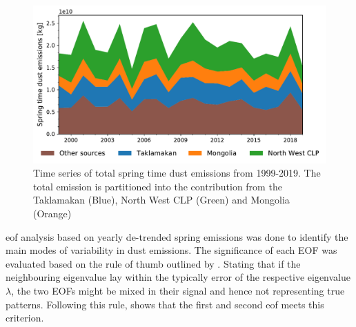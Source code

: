 \begin{figure}[htbp]
    \centering
    \includegraphics[width=\textwidth]{../figs/Emission_timeseries.pdf}
    \caption{Time series of total spring time dust emissions from 1999-2019. The total emission is partitioned into the contribution from the Taklamakan (Blue), North West CLP (Green) and Mongolia (Orange) }
    \label{fig:emission_timeseries}
\end{figure}
\acrfull{eof} analysis based on yearly de-trended spring emissions was done to identify the main modes of variability in dust emissions. The significance of each EOF was evaluated based on the rule of thumb outlined by \textcite{north1982sampling}. Stating that if the neighbouring eigenvalue lay within the typically error of the respective eigenvalue $\lambda$, the two EOFs might be mixed in their signal and hence not representing true patterns. Following this rule,  shows that the first and second \acrshort{eof} meets this criterion.  

